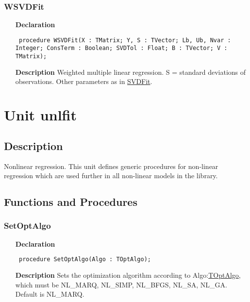 \documentclass[12pt,a4paper,oneside]{report}
\newcommand{\declarationitem}[1]{\textbf{#1}}
\newcommand{\descriptiontitle}[1]{\textbf{#1}}
\newcommand{\code}[1]{\texttt{#1}}
\begin{document}
\subsubsection{WSVDFit}
\label{usvdfit-WSVDFit}
\begin{itemize}\item[\declarationitem{Declaration}\hfill]
	\begin{flushleft}
		\code{
			procedure WSVDFit(X : TMatrix; Y, S : TVector; Lb, Ub, Nvar : Integer; ConsTerm : Boolean; SVDTol : Float; B : TVector; V : TMatrix);}
		
	\end{flushleft}
	
	\par
	\item[\descriptiontitle{Description}]
	Weighted multiple linear regression. S = standard deviations of observations. Other parameters as in \hyperref[usvdfit-SVDFit]{SVDFit}.
	
\end{itemize}

\section{Unit unlfit}
\label{unlfit}
\subsection{Description}
Nonlinear regression. This unit defines generic procedures for non-linear regression which are used further in all non-linear models in the library. 
\subsection{Functions and Procedures}
\subsubsection{SetOptAlgo}
\label{unlfit-SetOptAlgo}
\begin{itemize}\item[\declarationitem{Declaration}\hfill]
	\begin{flushleft}
		\code{
			procedure SetOptAlgo(Algo : TOptAlgo);}
		
	\end{flushleft}
	
	\par
	\item[\descriptiontitle{Description}]
	Sets the optimization algorithm according to Algo:\hyperref[utypes-TOptAlgo]{TOptAlgo}, which must be NL{\_}MARQ, NL{\_}SIMP, NL{\_}BFGS, NL{\_}SA, NL{\_}GA. Default is NL{\_}MARQ.
	
\end{itemize}
\end{document}
